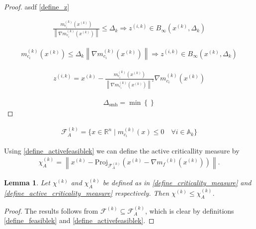 \documentclass{article}
\newtheorem{lemma}[theorem]{Lemma}
\theoremstyle{case}
\numberwithin{theorem}{subsection}
\newcommand{\activeconstraintsk}{{\mathbb A_{k}}}
\newcommand{\chik}{{\chi^{(k)}}}
\newcommand{\dk}{\Delta_k}
\newcommand{\feasiblek}{{\mathcal F^{(k)}}}
\newcommand{\gmcik}{{\nabla m_{c_i}^{(k)}\left(\xk\right)}}
\newcommand{\mcik}{{{m}^{(k)}_{c_i}}}
\newcommand{\mfk}{{{m}_f}^{(k)}}
\newcommand{\Rn}{\mathbb R^n}
\newcommand{\tr}{{ B_{\infty}\left(\xk, \dk\right) }}
\newcommand{\xk}{{x^{(k)}}}
\newcommand{\zik}{{z^{(i, k)}}}
\newcommand{\activefeasiblek}{{\mathcal F^{(k)}_A}}
\newcommand{\activechik}{{\chi_A^{(k)}}}
\newcommand{\deltaacit}{{\Delta_{\textrm{smh}}}}
\begin{document}
\begin{proof}
asdf
\cref{define_z}



\begin{align*}
\frac{m^{(k)}_{c_i}(\xk)}{\left\|\gmcik\right\|} \le \dk
\Longrightarrow \zik \in \tr
\end{align*}

\begin{align*}
m^{(k)}_{c_i}(\xk) \le \dk \left\|\gmcik\right\|
\Longrightarrow \zik \in \tr
\end{align*}


\begin{align*}
\zik = \xk - \frac{m^{(k)}_{c_i}(\xk)}{\left\|\gmcik\right\|^2} \gmcik
\end{align*}

\begin{align*}
\deltaacit = \min\left\{\right\}
\end{align*}
\end{proof}





\begin{align}
\activefeasiblek = \{x \in \Rn \; | \; \mcik(x) \le 0 \quad \forall i \in \activeconstraintsk \} \label{define_activefeasiblek}
\end{align}

Using \cref{define_activefeasiblek} we can define the active criticallity measure by
\begin{align}
\activechik = \left\|\xk - \text{Proj}_{\activefeasiblek}\left(\xk- \nabla \mfk\left(\xk\right)\right)\right\| \label{define_active_criticality_measure}.
\end{align}


\begin{lemma}
Let $\chik$ and $\activechik$ be defined as in \cref{define_criticality_measure} and \cref{define_active_criticality_measure} respectively.
Then $\chik \le \activechik$.
\end{lemma}
\begin{proof}
The results follows from $\feasiblek \subseteq \activefeasiblek$, which is clear by definitions \cref{define_feasiblek} and \cref{define_activefeasiblek}.
\end{proof}
\end{document}
